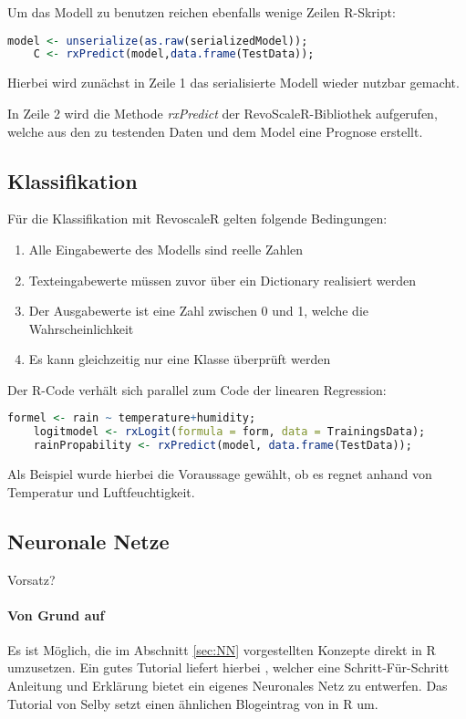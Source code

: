 Um das Modell zu benutzen reichen ebenfalls wenige Zeilen R-Skript: \newline

\begin{lstlisting}[language=R]
	model <- unserialize(as.raw(serializedModel)); 
	C <- rxPredict(model,data.frame(TestData));
\end{lstlisting}

Hierbei wird zunächst in Zeile 1 das serialisierte Modell wieder nutzbar gemacht. 

In Zeile 2 wird die Methode \textit{rxPredict} der RevoScaleR-Bibliothek aufgerufen, welche aus den zu testenden Daten und dem Model eine Prognose erstellt. 
\subsection{Klassifikation}
Für die Klassifikation mit RevoscaleR gelten folgende Bedingungen: ~\newline

\begin{enumerate}
	\item Alle Eingabewerte des Modells sind reelle Zahlen
	\item Texteingabewerte müssen zuvor über ein Dictionary realisiert werden
	\item Der Ausgabewerte ist eine Zahl zwischen 0 und 1, welche die Wahrscheinlichkeit 
	\item Es kann gleichzeitig nur eine Klasse überprüft werden
\end{enumerate}

Der R-Code verhält sich parallel zum Code der linearen Regression:

\begin{lstlisting}[language=R]
	formel <- rain ~ temperature+humidity;
	logitmodel <- rxLogit(formula = form, data = TrainingsData);
	rainPropability <- rxPredict(model, data.frame(TestData));
\end{lstlisting}

Als Beispiel wurde hierbei die Voraussage gewählt, ob es regnet anhand von Temperatur und Luftfeuchtigkeit.
\subsection{Neuronale Netze}
Vorsatz?
\paragraph{Von Grund auf}
Es ist Möglich, die im Abschnitt \ref{sec:NN} vorgestellten Konzepte direkt in R umzusetzen. Ein gutes Tutorial liefert hierbei \cite{SelbyNN}, welcher eine Schritt-Für-Schritt Anleitung und Erklärung bietet ein eigenes Neuronales Netz zu entwerfen. Das Tutorial von Selby setzt einen ähnlichen Blogeintrag von \cite{DennyNN} in R um. 

